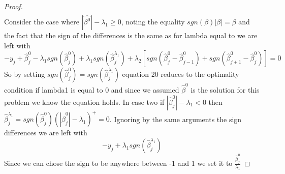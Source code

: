 \documentclass{article}
\theoremstyle{definition}
\begin{document}
\begin{proof}
\begin{align}
	\end{align}
	Consider the case  where $|\hat{\beta^0}|-\lambda_1\geq0$, noting the equality $sgn(\beta)|\beta|=\beta$ and the fact that the sign of the differences is the same as for lambda equal to we are left with
	\begin{equation}
	-y_j+\hat{\beta}_j^0-\lambda_1 sgn(\hat{\beta}^0_j) + \lambda_1sgn(\hat{\beta}^{\lambda_1}_j)+\lambda_2 [sgn(\hat{\beta}^{0}_j-\hat{\beta}^{0}_{j-1})+sgn(\hat{\beta}^{0}_{j+1}-\hat{\beta}^{0}_j)]=0
	\end{equation}
	So by setting $sgn(\hat{\beta}^0_j)=sgn(\hat{\beta}^{\lambda_1}_j)$ equation 20 reduces to the optimality condition if lambda1 is equal to 0 and since we assumed $\hat{\beta}^0$ is the solution for this problem we know the equation holds.
	In case two if $|\hat{\beta}_j^0|-\lambda_1<0$ then $\hat{\beta}_j^{\lambda_1}=sgn(\hat{\beta}_j^0)(|\hat{\beta}_j^0|-\lambda_1)^{\text{+}}=0$. Ignoring by the same arguments the sign differences we are left with
	\begin{equation}
	-y_j+\lambda_1 sgn(\hat{\beta}_j^{\lambda_1})
	\end{equation}
	Since we can chose the sign to be anywhere between -1 and 1 we set it to $\frac{\hat{\beta}_j^{0}}{\lambda_1}$
\end{proof}
\end{document}
